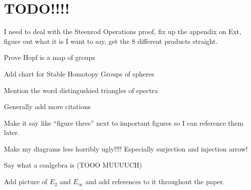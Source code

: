 \section{TODO!!!!}



I need to deal with the Steenrod Operations proof, fix up the appendix on Ext, figure out what it is I want to say, get the 8 different products straight.  

Prove Hopf is a map of groups

Add chart for Stable Homotopy Groups of spheres

Mention the word distingushied triangles of spectra

Generally add more citations

Make it say like ``figure three'' next to important figures so I can reference them later.

Make my diagrams less horribly ugly!!!!  Especially surjection and injection arrow!

Say what a coalgebra is (TOOO MUUUUCH)

Add picture of $E_2$ and $E_\infty$ and add references to it throughout the paper.  
